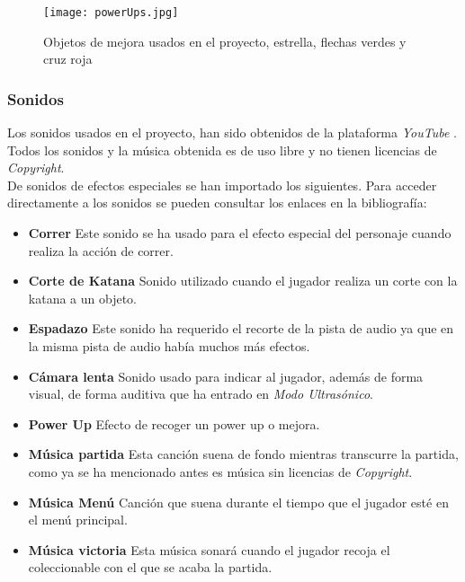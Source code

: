 \begin{figure}[H]
    \centering
    \texttt{[image: powerUps.jpg]}
    \caption{Objetos de mejora usados en el proyecto, estrella, flechas verdes y cruz roja}
\end{figure}


\subsubsection{Sonidos}

Los sonidos usados en el proyecto, han sido obtenidos de la plataforma \textit{YouTube} \cite{YouTube}. Todos los sonidos y la música obtenida es de uso libre y no tienen licencias de \textit{Copyright}.\\

De sonidos de efectos especiales se han importado los siguientes. Para acceder directamente a los sonidos se pueden consultar los enlaces en la bibliografía: 
\begin{itemize}
    \item \textbf{Correr} \cite{correr} Este sonido se ha usado para el efecto especial del personaje cuando realiza la acción de correr.
    \item \textbf{Corte de Katana} \cite{CorteKatana} Sonido utilizado cuando el jugador realiza un corte con la katana a un objeto.
    \item \textbf{Espadazo} \cite{Espadazo} Este sonido ha requerido el recorte de la pista de audio ya que en la misma pista de audio había muchos más efectos.
    \item \textbf{Cámara lenta} \cite{CamaraLenta} Sonido usado para indicar al jugador, además de forma visual, de forma auditiva que ha entrado en \textit{Modo Ultrasónico}. 
    \item \textbf{Power Up} \cite{PowerUp} Efecto de recoger un power up o mejora. 
    \item \textbf{Música partida} \cite{musicaGame} Esta canción suena de fondo mientras transcurre la partida, como ya se ha mencionado antes es música sin licencias de \textit{Copyright}.
    \item \textbf{Música Menú } \cite{musicaMenu} Canción que suena durante el tiempo que el jugador esté en el menú principal.
    \item \textbf{Música victoria} \cite{musicaWin} Esta música sonará cuando el jugador recoja el coleccionable con el que se acaba la partida.   
\end{itemize}

